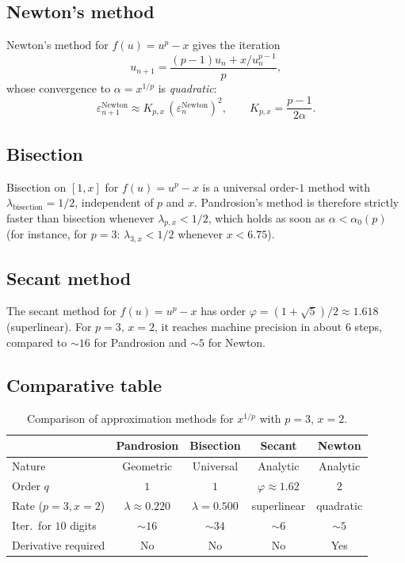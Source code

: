 \documentclass[11pt,a4paper]{article}
\theoremstyle{definition}
\newcommand{\eps}{\varepsilon}
\begin{document}
\subsection{Newton's method}

Newton's method for $f(u) = u^p - x$ gives the iteration
\[
  u_{n+1} = \frac{(p-1)u_n + x/u_n^{p-1}}{p},
\]
whose convergence to $\alpha = x^{1/p}$ is \emph{quadratic}:
\[
  \eps_{n+1}^{\text{Newton}} \approx K_{p,x}\,(\eps_n^{\text{Newton}})^2, \qquad K_{p,x} = \frac{p-1}{2\alpha}.
\]

\subsection{Bisection}

Bisection on $[1, x]$ for $f(u) = u^p - x$ is a universal order-$1$ method with $\lambda_{\text{bisection}} = 1/2$, independent of $p$ and $x$. Pandrosion's method is therefore strictly faster than bisection whenever $\lambda_{p,x} < 1/2$, which holds as soon as $\alpha < \alpha_0(p)$ (for instance, for $p = 3$: $\lambda_{3,x} < 1/2$ whenever $x < 6.75$).

\subsection{Secant method}

The secant method for $f(u) = u^p - x$ has order $\varphi = (1+\sqrt{5})/2 \approx 1.618$ (superlinear). For $p = 3$, $x = 2$, it reaches machine precision in about $6$ steps, compared to $\sim 16$ for Pandrosion and $\sim 5$ for Newton.

\subsection{Comparative table}

\begin{table}[h]
\centering
\renewcommand{\arraystretch}{1.4}
\begin{tabular}{lcccc}
\toprule
& \textbf{Pandrosion} & \textbf{Bisection} & \textbf{Secant} & \textbf{Newton} \\
\midrule
Nature & Geometric & Universal & Analytic & Analytic \\
Order $q$ & $1$ & $1$ & $\varphi \approx 1.62$ & $2$ \\
Rate ($p\!=\!3, x\!=\!2$) & $\lambda \approx 0.220$ & $\lambda = 0.500$ & superlinear & quadratic \\
Iter.\ for $10$ digits & $\sim 16$ & $\sim 34$ & $\sim 6$ & $\sim 5$ \\
Derivative required & No & No & No & Yes \\
\bottomrule
\end{tabular}
\caption{Comparison of approximation methods for $x^{1/p}$ with $p=3$, $x=2$.}
\end{table}
\end{document}
